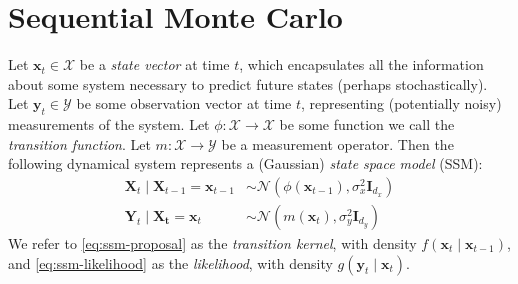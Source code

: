 \section{Sequential Monte Carlo}

\begin{definition} \label{def:ssm}
    Let $\mathbf{x}_t \in \mathcal{X}$ be a \emph{state vector} at time $t$, which encapsulates all
    the information about some system necessary to predict future states (perhaps stochastically).
    Let $\mathbf{y}_t \in \mathcal{Y}$ be some observation vector at time $t$, representing
    (potentially noisy) measurements of the system. Let $\phi: \mathcal{X} \to \mathcal{X}$ be some
    function we call the \emph{transition function}. Let $m: \mathcal{X} \to \mathcal{Y}$ be a
    measurement operator. Then the following dynamical system represents a (Gaussian)
    \emph{state space model} (SSM):
    \begin{align}
        \mathbf{X}_t \mid \mathbf{X}_{t-1} = \mathbf{x}_{t-1} &\sim \mathcal{N}(\phi(\mathbf{x}_{t-1}), \sigma_x^2 \mathbf{I}_{d_x}) \label{eq:ssm-proposal} \\
        \mathbf{Y}_t \mid \mathbf{X_t} = \mathbf{x}_t &\sim \mathcal{N}(m(\mathbf{x}_t), \sigma_y^2 \mathbf{I}_{d_y}) \label{eq:ssm-likelihood}
    \end{align}
    We refer to \ref{eq:ssm-proposal} as the \emph{transition kernel}, with density
    $f(\mathbf{x}_t \mid \mathbf{x}_{t-1})$, and \ref{eq:ssm-likelihood} as the \emph{likelihood},
    with density $g(\mathbf{y}_t \mid \mathbf{x}_t)$.
\end{definition}

